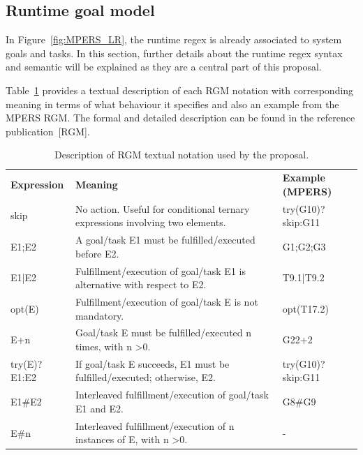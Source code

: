 \subsection{Runtime goal model}

In Figure~\ref{fig:MPERS_LR}, the runtime regex is already associated to system goals and tasks. In this section, further details about the runtime regex syntax and semantic will be explained as they are a central part of this proposal. 

Table~\ref{tab:RGM_REGEX} provides a textual description of each RGM notation with corresponding meaning in terms of what behaviour it specifies and also an example from the MPERS RGM. The formal and detailed description can be found in the reference publication~[RGM].

\begin{table}[h]\label{tab:RGM_REGEX}
{\renewcommand{\arraystretch}{1.5}
\begin{tabularx}{\textwidth}{@{}l|X|X@{}}
\toprule
\textbf{Expression} & \textbf{Meaning}                                                                   & \textbf{Example (MPERS)} \\ 
skip                & No action. Useful for conditional ternary expressions involving two elements.      & try(G10)?skip:G11        \\ 
E1;E2               & A goal/task E1 must be fulfilled/executed before E2.                               & G1;G2;G3                 \\ 
E1|E2               & Fulfillment/execution of goal/task E1 is alternative with respect to E2. & T9.1|T9.2                \\ 
opt(E)              & Fulfillment/execution of goal/task E is not mandatory.                             & opt(T17.2)               \\ 
E+n                 & Goal/task E must be fulfilled/executed n times, with n \textgreater 0.             & G22+2                    \\ 
try(E)?E1:E2        & If goal/task E succeeds, E1 must be fulfilled/executed; otherwise, E2.             & try(G10)?skip:G11        \\ 
E1\#E2              & Interleaved fulfillment/execution of goal/task E1 and E2.                          & G8\#G9                   \\ 
E\#n                & Interleaved fulfillment/execution of n instances of E, with n \textgreater 0.      & -                        \\ \bottomrule
\end{tabularx}
}
\caption{Description of RGM textual notation used by the proposal.}
\end{table}

